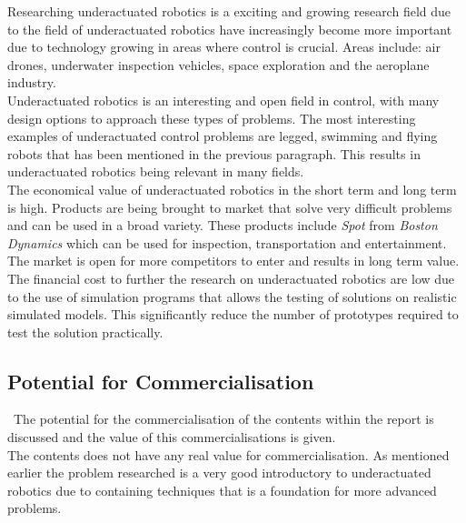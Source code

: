 Researching underactuated robotics is a exciting and growing research field due to the field of underactuated robotics have increasingly become more important due to technology growing in areas where control is crucial. Areas include: air drones, underwater inspection vehicles, space exploration and the aeroplane industry. \\

Underactuated robotics is an interesting and open field in control, with many design options to approach these types of problems. The most interesting examples of underactuated control problems are legged, swimming and flying robots that has been mentioned in the previous paragraph. This results in underactuated robotics being relevant in many fields.\\

The economical value of underactuated robotics in the short term and long term is high. Products are being brought to market that solve very difficult problems and can be used in a broad variety. These products include \textit{Spot} from \textit{Boston Dynamics} which can be used for inspection, transportation and entertainment. The market is open for more competitors to enter and results in long term value.\\

The financial cost to further the research on underactuated robotics are low due to the use of simulation programs that allows the testing of solutions on realistic simulated models. This significantly reduce the number of prototypes required to test the solution practically. 

\subsection{Potential for Commercialisation}\
The potential for the commercialisation of the contents within the report is discussed and the value of this commercialisations is given.\\

The contents does not have any real value for commercialisation. As mentioned earlier the problem researched is a very good introductory to underactuated robotics due to containing techniques that is a foundation for more advanced problems. 




\endinput
